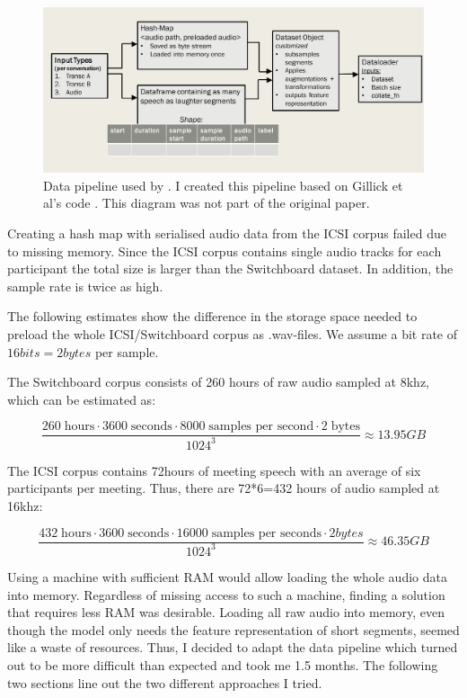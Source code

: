 \documentclass[bsc,frontabs,parskip,deptreport]{infthesis}
\begin{document}
\begin{figure}
    \centering
    \includegraphics[width=14cm]{imgs/diagrams/Gillick_et_al_data_pipeline.png}
    \caption{Data pipeline used by \citet{gillick2021robust}. I created this pipeline based on Gillick et al's code \citep{gillick-codebase}. This diagram was not part of the original paper.}
    \label{fig:gillick-data-pipeline}
\end{figure}

Creating a hash map with serialised audio data from the ICSI corpus failed due to missing memory. Since the ICSI corpus contains single audio tracks for each participant the total size is larger than the Switchboard dataset. In addition, the sample rate is twice as high. 

The following estimates show the difference in the storage space needed to preload the whole ICSI/Switchboard corpus as .wav-files. We assume a bit rate of $16bits=2bytes$ per sample.

The Switchboard corpus consists of 260 hours of raw audio sampled at 8khz, which can be estimated as:

$$ \frac{260\;\textrm{hours} \cdot 3600\;\textrm{seconds} \cdot 8000\;\textrm{samples per second} \cdot 2\;\textrm{bytes}}{1024^3} \approx 13.95 GB $$  

The ICSI corpus contains 72hours of meeting speech with an average of six participants per meeting. Thus, there are 72*6=432 hours of audio sampled at 16khz:

$$ \frac{432\;\textrm{hours} \cdot 3600\;\textrm{seconds} \cdot 16000 \;\textrm{samples per seconds} \cdot 2bytes}{1024^3} \approx 46.35 GB $$

Using a machine with sufficient RAM would allow loading the whole audio data into memory. 
Regardless of missing access to such a machine, finding a solution that requires less RAM was desirable. Loading all raw audio into memory, even though the model only needs the feature representation of short segments, seemed like a waste of resources. Thus, I decided to adapt the data pipeline which turned out to be more difficult than expected and took me 1.5 months. The following two sections line out the two different approaches I tried. 
\end{document}
